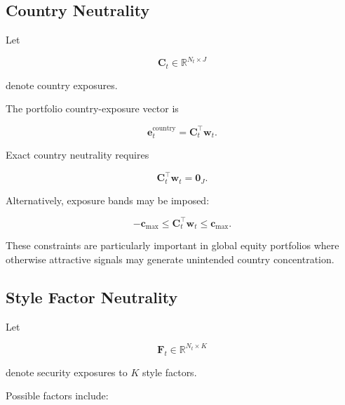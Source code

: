 \documentclass[11pt,a4paper]{article}
\begin{document}
\subsection{Country Neutrality}
\label{subsec:portfolio_country_neutrality}

Let

\begin{equation}
\mathbf{C}_t
\in
\mathbb{R}^{N_t\times J}
\end{equation}

denote country exposures.

The portfolio country-exposure vector is

\begin{equation}
\boxed{
\mathbf{e}_t^{\mathrm{country}}
=
\mathbf{C}_t^\top
\mathbf{w}_t.
}
\end{equation}

Exact country neutrality requires

\begin{equation}
\boxed{
\mathbf{C}_t^\top
\mathbf{w}_t
=
\mathbf{0}_{J}.
}
\end{equation}

Alternatively, exposure bands may be imposed:

\begin{equation}
-\mathbf{c}_{\max}
\leq
\mathbf{C}_t^\top
\mathbf{w}_t
\leq
\mathbf{c}_{\max}.
\end{equation}

These constraints are particularly important in global equity portfolios where
otherwise attractive signals may generate unintended country concentration.


\subsection{Style Factor Neutrality}
\label{subsec:portfolio_style_factor_neutrality}

Let

\begin{equation}
\mathbf{F}_t
\in
\mathbb{R}^{N_t\times K}
\end{equation}

denote security exposures to $K$ style factors.

Possible factors include:
\end{document}
